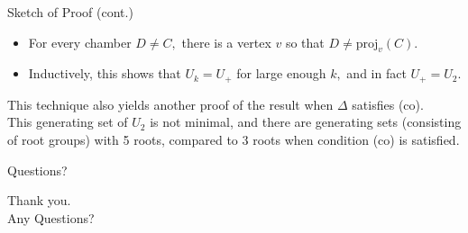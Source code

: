 \documentclass[xcolor=dvipsnames]{beamer}
\newcommand{\proj}{\ensuremath{\mathrm{proj}}}
\theoremstyle{definition}
\begin{document}
\begin{frame}{Sketch of Proof (cont.)}
	\begin{itemize}
		\item For every chamber $D\neq C,$ there is a vertex $v$ so that $D\neq \proj_v(C).$
		\pause
	\item Inductively, this shows that $U_k=U_+$ for large enough $k,$ and in fact $U_+=U_2.$
		\pause
	\end{itemize}
	\bigskip
	This technique also yields another proof of the result when $\Delta$ satisfies (co).\\
	\bigskip
	\pause
	This generating set of $U_2$ is not minimal, and there are generating sets (consisting of root groups) with 5 roots, compared to 3 roots when condition (co) is satisfied.
\end{frame}

\begin{frame}{Questions?}
\begin{center}
	\Large
	Thank you.\\
\bigskip
\bigskip
Any Questions?

\end{center}
\end{frame}
\end{document}
